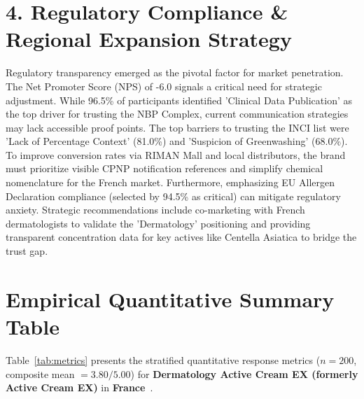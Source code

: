 \documentclass[10pt,twocolumn,a4paper]{article}
\begin{document}
\section{4. Regulatory Compliance \& Regional Expansion Strategy}
Regulatory transparency emerged as the pivotal factor for market penetration. The Net Promoter Score (NPS) of -6.0 signals a critical need for strategic adjustment. While 96.5\% of participants identified 'Clinical Data Publication' as the top driver for trusting the NBP Complex, current communication strategies may lack accessible proof points. The top barriers to trusting the INCI list were 'Lack of Percentage Context' (81.0\%) and 'Suspicion of Greenwashing' (68.0\%). To improve conversion rates via RIMAN Mall and local distributors, the brand must prioritize visible CPNP notification references and simplify chemical nomenclature for the French market. Furthermore, emphasizing EU Allergen Declaration compliance (selected by 94.5\% as critical) can mitigate regulatory anxiety. Strategic recommendations include co-marketing with French dermatologists to validate the 'Dermatology' positioning and providing transparent concentration data for key actives like Centella Asiatica to bridge the trust gap.


\section{Empirical Quantitative Summary Table}
Table~\ref{tab:metrics} presents the stratified quantitative response metrics ($n = 200$, composite mean $= 3.80/5.00$) for \textbf{Dermatology Active Cream EX (formerly Active Cream EX)} in \textbf{France}~\cite{ref_kaggle_doi,ref_hf_doi}.
\end{document}
